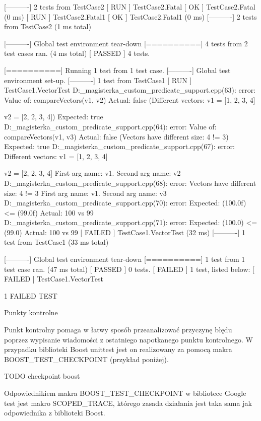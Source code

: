 [----------] 2 tests from TestCase2
[ RUN      ] TestCase2.Fatal
[       OK ] TestCase2.Fatal (0 ms)
[ RUN      ] TestCase2.Fatal1
[       OK ] TestCase2.Fatal1 (0 ms)
[----------] 2 tests from TestCase2 (1 ms total)

[----------] Global test environment tear-down
[==========] 4 tests from 2 test cases ran. (4 ms total)
[  PASSED  ] 4 tests.


[==========] Running 1 test from 1 test case.
[----------] Global test environment set-up.
[----------] 1 test from TestCase1
[ RUN      ] TestCase1.VectorTest
D:\cmake_magisterka\gtest_custom_predicate_support\test\main.cpp(63): error: Value of: compareVectors(v1, v2)
  Actual: false (Different vectors:
v1 = [1, 2, 3, 4]

v2 = [2, 2, 3, 4])
Expected: true
D:\cmake_magisterka\gtest_custom_predicate_support\test\main.cpp(64): error: Value of: compareVectors(v1, v3)
  Actual: false (Vectors have different size: 4 != 3)
Expected: true
D:\cmake_magisterka\gtest_custom_predicate_support\test\main.cpp(67): error: Different vectors:
v1 = [1, 2, 3, 4]

v2 = [2, 2, 3, 4] First arg name: v1. Second arg name: v2
D:\cmake_magisterka\gtest_custom_predicate_support\test\main.cpp(68): error: Vectors have different size: 4 != 3 First arg name: v1. Second arg name: v3
D:\cmake_magisterka\gtest_custom_predicate_support\test\main.cpp(70): error: Expected: (100.0f) <= (99.0f)
  Actual: 100 vs 99
D:\cmake_magisterka\gtest_custom_predicate_support\test\main.cpp(71): error: Expected: (100.0) <= (99.0)
  Actual: 100 vs 99
[  FAILED  ] TestCase1.VectorTest (32 ms)
[----------] 1 test from TestCase1 (33 ms total)

[----------] Global test environment tear-down
[==========] 1 test from 1 test case ran. (47 ms total)
[  PASSED  ] 0 tests.
[  FAILED  ] 1 test, listed below:
[  FAILED  ] TestCase1.VectorTest

 1 FAILED TEST

Punkty kontrolne

Punkt kontrolny pomaga w łatwy sposób przeanalizować przyczynę błędu poprzez wypisanie wiadomości z ostatniego napotkanego punktu kontrolnego. W przypadku biblioteki Boost unittest jest on realizowany za pomocą makra BOOST_TEST_CHECKPOINT (przykład poniżej).

TODO checkpoint boost

Odpowiednikiem makra BOOST_TEST_CHECKPOINT w bibliotece Google test jest makro SCOPED_TRACE, którego zasada działania jest taka sama jak odpowiednika z biblioteki Boost.

